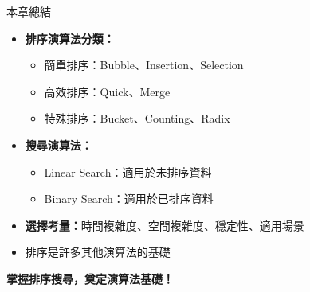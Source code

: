 \documentclass{beamer}
\begin{document}
\begin{frame}{本章總結}
\begin{itemize}
    \item \textbf{排序演算法分類：}
    \begin{itemize}
        \item 簡單排序：Bubble、Insertion、Selection
        \item 高效排序：Quick、Merge
        \item 特殊排序：Bucket、Counting、Radix
    \end{itemize}
    \item \textbf{搜尋演算法：}
    \begin{itemize}
        \item Linear Search：適用於未排序資料
        \item Binary Search：適用於已排序資料
    \end{itemize}
    \item \textbf{選擇考量：}時間複雜度、空間複雜度、穩定性、適用場景
    \item 排序是許多其他演算法的基礎
\end{itemize}

\vspace{1em}
\begin{center}
    \textbf{掌握排序搜尋，奠定演算法基礎！}
\end{center}
\end{frame}
\end{document}

